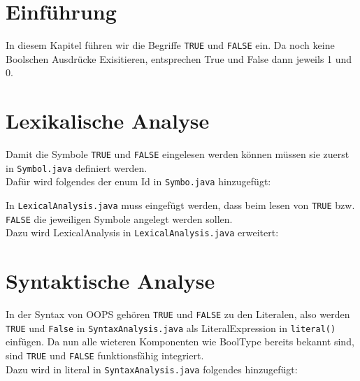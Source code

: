 \section{Einführung}
In diesem Kapitel führen wir die Begriffe \verb|TRUE| und \verb|FALSE| ein.
Da noch keine Boolschen Ausdrücke Exisitieren, entsprechen True und False dann jeweils 1 und 0.\\

\section{Lexikalische Analyse}
Damit die Symbole  \verb|TRUE| und \verb|FALSE|  eingelesen werden können müssen sie zuerst in  \verb|Symbol.java| definiert werden.\\
Dafür wird folgendes der enum Id in \verb|Symbo.java| hinzugefügt:

In \verb|LexicalAnalysis.java| muss eingefügt werden, dass beim lesen von \verb|TRUE| bzw. \verb|FALSE| die jeweiligen Symbole angelegt werden sollen.\\
Dazu wird LexicalAnalysis in \verb|LexicalAnalysis.java| erweitert:


\section{Syntaktische Analyse}
In der Syntax von OOPS gehören  \verb|TRUE| und \verb|FALSE| zu den Literalen, also werden \verb|TRUE| und \verb|False| in \verb|SyntaxAnalysis.java|  als LiteralExpression in \verb|literal()| einfügen. Da nun alle wieteren Komponenten wie BoolType bereits bekannt sind, sind \verb|TRUE| und \verb|FALSE| funktionsfähig integriert.\\
Dazu wird in literal in \verb|SyntaxAnalysis.java| folgendes hinzugefügt:

